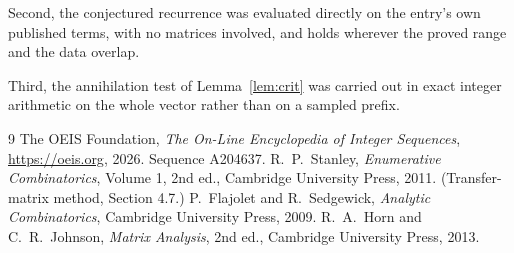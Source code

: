 \documentclass[11pt,a4paper]{article}
\theoremstyle{plain}
\theoremstyle{definition}
\begin{document}
Second, the conjectured recurrence was evaluated directly on the entry's own published terms,
with no matrices involved, and holds wherever the proved range and the data overlap.

Third, the annihilation test of Lemma~\ref{lem:crit} was carried out in exact integer
arithmetic on the whole vector rather than on a sampled prefix.

\begin{thebibliography}{9}
 The OEIS Foundation, \emph{The On-Line Encyclopedia of Integer
Sequences}, \url{https://oeis.org}, 2026. Sequence A204637.
 R.~P.~Stanley, \emph{Enumerative Combinatorics}, Volume 1, 2nd ed.,
Cambridge University Press, 2011. (Transfer-matrix method, Section 4.7.)
 P.~Flajolet and R.~Sedgewick, \emph{Analytic Combinatorics}, Cambridge
University Press, 2009.
 R.~A.~Horn and C.~R.~Johnson, \emph{Matrix Analysis}, 2nd ed., Cambridge
University Press, 2013.
\end{thebibliography}
\end{document}
